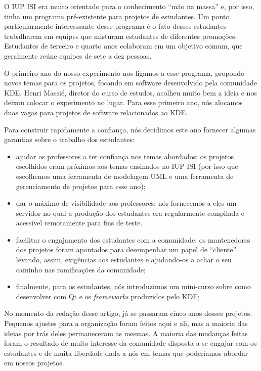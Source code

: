 O IUP ISI era muito orientado para o conhecimento ``mão na massa'' e, por isso, tinha
um programa pré-existente para projetos de estudantes. Um ponto particularmente interesssante
desse programa é o fato desses estudantes trabalharem em equipes que misturam estudantes de
diferentes promoções. Estudantes de terceiro e quarto anos colaboram em um objetivo comum, 
que geralmente reúne equipes de sete a dez pessoas.

O primeiro ano do nosso experimento nos ligamos a esse programa, propondo novos
temas para os projetos, focando em software desenvolvido pela comunidade KDE.
Henri Massié, diretor do curso de estudos, acolheu muito bem a ideia e nos deixou
colocar o experimento no lugar. Para esse primeiro ano, nós alocamos duas vagas para
projetos de software relacionados ao KDE.

Para construir rapidamente a confiança, nós decidimos este ano fornecer algumas garantias
sobre o trabalho dos estudantes:
\begin{itemize}
  \item ajudar os professores a ter confiança nos temas abordados: os projetos
escolhidos eram próximos aos temas ensinados no IUP ISI (por isso que escolhemos
uma ferramenta de modelagem UML e uma ferramenta de gerenciamento de projetos para
esse ano);
  \item dar o máximo de visibilidade aos professores: nós fornecemos a eles um
servidor no qual a produção dos estudantes era regularmente compilada e acessível
remotamente para fins de teste.
  \item facilitar o engajamento dos estudantes com a comunidade: os mantenedores
dos projetos foram apontados para desempenhar um papel de ``cliente'' levando, assim,
exigências aos estudantes e ajudando-os a achar o seu caminho nas ramificações da
comunidade;
  \item finalmente, para os estudantes, nós introduzimos um mini-curso sobre como
desenvolver com Qt e os \textit{frameworks} produzidos pelo KDE;
\end{itemize}

No momento da redação desse artigo, já se passaram cinco anos desses projetos.
Pequenos ajustes para a organização foram feitos aqui e ali, mas a maioria das ideias
por trás deles permaneceram as mesmas. A maioria das mudanças feitas foram o resultado
de muito interesse da comunidade disposta a se engajar com os estudantes e de
muita liberdade dada a nós em temas que poderíamos abordar em nossos projetos.

